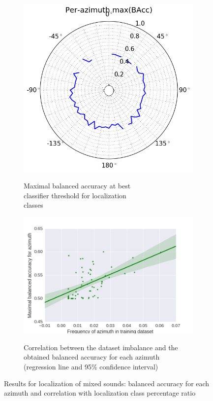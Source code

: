 \begin{figure}[htb]
\begin{subfigure}[t]{0.5\textwidth}
\hspace*{-1cm}
\includegraphics[scale=0.45]{images-architecture-mixed/loc_max_bacc}
\vspace*{.5cm}
\label{fig:results:loc_max_bacc}
\caption{Maximal balanced accuracy at best \\ classifier threshold for localization \\ classes}
\end{subfigure}
\begin{subfigure}[t]{0.5\textwidth}
\includegraphics[scale=0.45]{images-data/frequency_accuracy}
\label{fig:results:frequency_accuracy}
\caption{Correlation between the dataset imbalance and the obtained balanced accuracy for each azimuth (regression line and 95\% confidence interval)}
\end{subfigure}
\caption{Results for localization of mixed sounds: balanced accuracy for each azimuth and correlation with localization class percentage ratio}
\end{figure}